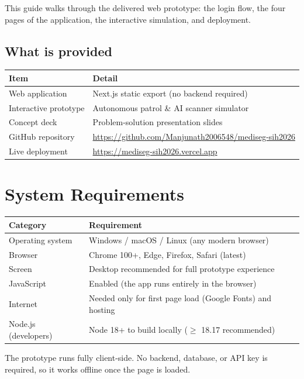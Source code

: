 \documentclass[11pt, a4paper]{article}
\begin{document}
This guide walks through the delivered web prototype: the login flow, the four
pages of the application, the interactive simulation, and deployment.

\subsection{What is provided}
\begin{tabularx}{\textwidth}{lX}
  \toprule
  \textbf{Item} & \textbf{Detail}\\
  \midrule
  Web application & Next.js static export (no backend required)\\
  Interactive prototype & Autonomous patrol \& AI scanner simulator\\
  Concept deck & Problem-solution presentation slides\\
  GitHub repository & \url{https://github.com/Manjunath2006548/mediseg-sih2026}\\
  Live deployment & \url{https://mediseg-sih2026.vercel.app}\\
  \bottomrule
\end{tabularx}

\section{System Requirements}

\begin{tabularx}{\textwidth}{lX}
  \toprule
  \textbf{Category} & \textbf{Requirement}\\
  \midrule
  Operating system & Windows / macOS / Linux (any modern browser)\\
  Browser & Chrome 100+, Edge, Firefox, Safari (latest)\\
  Screen & Desktop recommended for full prototype experience\\
  JavaScript & Enabled (the app runs entirely in the browser)\\
  Internet & Needed only for first page load (Google Fonts) and hosting\\
  Node.js (developers) & Node 18+ to build locally ($\ge$ 18.17 recommended)\\
  \bottomrule
\end{tabularx}

\begin{tipbox}
The prototype runs fully client-side. No backend, database, or API key is
required, so it works offline once the page is loaded.
\end{tipbox}
\end{document}
